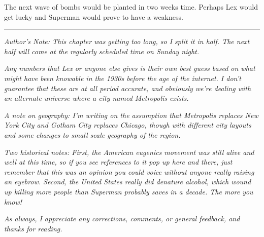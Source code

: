The next wave of bombs would be planted in two weeks time. Perhaps Lex
would get lucky and Superman would prove to have a weakness.

\begin{center}\rule{0.5\linewidth}{0.5pt}\end{center}

\emph{Author's Note: This chapter was getting too long, so I split it in
half. The next half will come at the regularly scheduled time on Sunday
night.}

\emph{Any numbers that Lex or anyone else gives is their own best guess
based on what might have been knowable in the 1930s before the age of
the internet. I don't guarantee that these are at all period accurate,
and obviously we're dealing with an alternate universe where a city
named Metropolis exists.}

\emph{A note on geography: I'm writing on the assumption that Metropolis
replaces New York City and Gotham City replaces Chicago, though with
different city layouts and some changes to small scale geography of the
region.}

\emph{Two historical notes: First, the American eugenics movement was
still alive and well at this time, so if you see references to it pop up
here and there, just remember that this was an opinion you could voice
without anyone really raising an eyebrow. Second, the United States
really did denature alcohol, which wound up killing more people than
Superman probably saves in a decade. The more you know!}

\emph{As always, I appreciate any corrections, comments, or general
feedback, and thanks for reading.}
